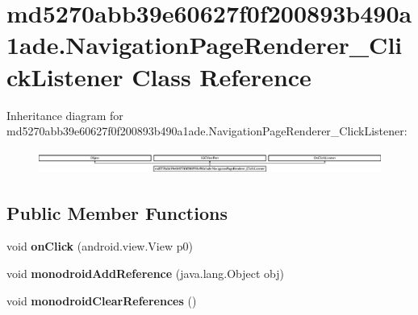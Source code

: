 \hypertarget{classmd5270abb39e60627f0f200893b490a1ade_1_1NavigationPageRenderer__ClickListener}{}\section{md5270abb39e60627f0f200893b490a1ade.\+Navigation\+Page\+Renderer\+\_\+\+Click\+Listener Class Reference}
\label{classmd5270abb39e60627f0f200893b490a1ade_1_1NavigationPageRenderer__ClickListener}
Inheritance diagram for md5270abb39e60627f0f200893b490a1ade.\+Navigation\+Page\+Renderer\+\_\+\+Click\+Listener\+:\begin{figure}[H]
\begin{center}
\leavevmode
\includegraphics[height=0.766598cm]{classmd5270abb39e60627f0f200893b490a1ade_1_1NavigationPageRenderer__ClickListener}
\end{center}
\end{figure}
\subsection*{Public Member Functions}
\begin{DoxyCompactItemize}
\item 
\mbox{\label{classmd5270abb39e60627f0f200893b490a1ade_1_1NavigationPageRenderer__ClickListener_a975d110457a3664db2a90bdea3629a66}} 
void {\bfseries on\+Click} (android.\+view.\+View p0)
\item 
\mbox{\label{classmd5270abb39e60627f0f200893b490a1ade_1_1NavigationPageRenderer__ClickListener_a428aab41c9b41260494dc6a3cdea0121}} 
void {\bfseries monodroid\+Add\+Reference} (java.\+lang.\+Object obj)
\item 
\mbox{\label{classmd5270abb39e60627f0f200893b490a1ade_1_1NavigationPageRenderer__ClickListener_af660803b06bd1e254786d56ff75093bd}} 
void {\bfseries monodroid\+Clear\+References} ()
\end{DoxyCompactItemize}
